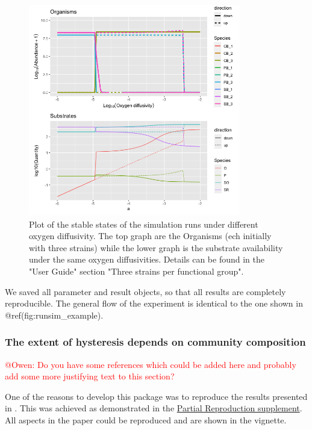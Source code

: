 \documentclass[]{elsarticle} %
\begin{document}
\begin{figure}

{\centering \includegraphics[width=350px]{figures/ug_three_strains_stable_state} 

}

\caption{Plot of the stable states of the simulation runs under different oxygen diffusivity. The top graph are the Organisms (ech initially with three strains) while the lower graph is the substrate availability under the same oxygen diffusivities. Details can be found in the "User Guide" section "Three strains per functional group".}\label{fig:uc1_stable_state}
\end{figure}

We saved all parameter and result objects, so that all results are
completely reproducible. The general flow of the experiment is identical
to the one shown in @ref(fig:runsim\_example).

\hypertarget{the-extent-of-hysteresis-depends-on-community-composition}{%
\subsubsection{The extent of hysteresis depends on community
composition}\label{the-extent-of-hysteresis-depends-on-community-composition}}

\textcolor{red}{@Owen: Do you have some references which could be added here and probably add some more justifying text to this section?}

One of the reasons to develop this package was to reproduce the results
presented in \citet{Bush2017}. This was achieved as demonstrated in the
\href{LINK_NEEDED}{Partial Reproduction supplement}. All aspects in the
paper could be reproduced and are shown in the vignette.
\end{document}
